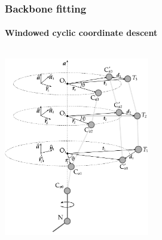 \documentclass{beamer}
\begin{document}
\begin{frame}[t, fragile]
\frametitle{Backbone fitting} 
\framesubtitle{Windowed cyclic coordinate descent}
\begin{columns}[c]
\column{3in}
\begin{center}
\vspace*{-6mm}
\includegraphics[width=2.5in]{ccd}
\end{center}
\column{2.0in}
\begin{itemize}
\end{itemize}
\end{columns}
\end{frame}
\end{document}
